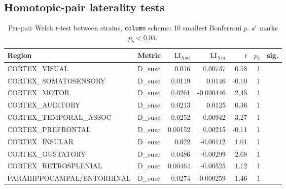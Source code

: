 \subsection{Homotopic-pair laterality tests}
\begin{table}[H]\centering\small
\caption{Per-pair Welch $t$-test between strains, \texttt{column} scheme: 10 smallest Bonferroni $p$. $\checkmark$ marks $p_b<0.05$.}
\begin{tabular}{@{}llrrrrc@{}}\toprule
Region & Metric & $\mathrm{LI}_{\mathrm{And}}$ & $\mathrm{LI}_{\mathrm{Arn}}$ & $t$ & $p_b$ & sig. \\\midrule
CORTEX\_VISUAL & D\_susc & 0.016 & 0.00737 & 0.58 & 1 &  \\
CORTEX\_SOMATOSENSORY & D\_susc & 0.0119 & 0.0146 & -0.10 & 1 &  \\
CORTEX\_MOTOR & D\_susc & 0.0261 & -0.000446 & 2.45 & 1 &  \\
CORTEX\_AUDITORY & D\_susc & 0.0213 & 0.0125 & 0.36 & 1 &  \\
CORTEX\_TEMPORAL\_ASSOC & D\_susc & 0.0252 & 0.00942 & 3.27 & 1 &  \\
CORTEX\_PREFRONTAL & D\_susc & 0.00152 & 0.00215 & -0.11 & 1 &  \\
CORTEX\_INSULAR & D\_susc & 0.022 & -0.00112 & 1.01 & 1 &  \\
CORTEX\_GUSTATORY & D\_susc & 0.0486 & -0.00299 & 2.68 & 1 &  \\
CORTEX\_RETROSPLENIAL & D\_susc & 0.00464 & -0.00525 & 1.12 & 1 &  \\
PARAHIPPOCAMPAL/ENTORHINAL & D\_susc & 0.0274 & -0.000259 & 1.46 & 1 &  \\
\bottomrule\end{tabular}\end{table}

